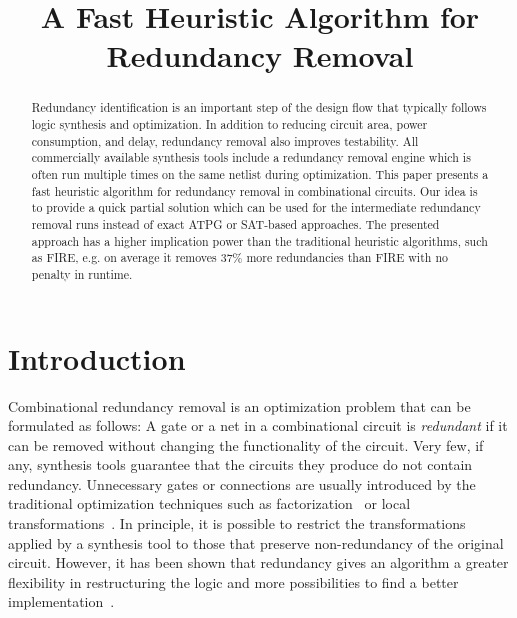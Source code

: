 \documentclass[conference]{IEEEtran} \usepackage{times}
\begin{document}
\title{A Fast Heuristic Algorithm for Redundancy Removal}
\author{
\and
{}
}

\maketitle

\begin{abstract}
Redundancy identification is an important step of the design flow that typically follows logic synthesis and optimization. In addition to reducing circuit area, power consumption, and delay, redundancy removal also improves testability.  All commercially available synthesis tools include a redundancy removal engine which is often run multiple times on the same netlist during optimization. This paper presents a fast heuristic algorithm for redundancy removal in combinational circuits. Our idea is to provide a quick partial solution which can be used for the intermediate redundancy removal runs instead of exact ATPG or SAT-based approaches. The presented approach has a higher implication power than the traditional heuristic algorithms, such as FIRE, e.g. on average it removes 37\% more redundancies than FIRE with no penalty in runtime. 
\end{abstract} 

\section{Introduction}
\label{into}

Combinational redundancy removal is an optimization problem that can
be formulated as follows: A gate or a net in a combinational circuit
is {\em redundant} if it can be removed without changing the functionality
of the circuit.
Very few, if any, synthesis tools
guarantee that the circuits they produce do not contain redundancy.
Unnecessary gates or connections are usually introduced by the
traditional optimization techniques such as factorization~\cite{BrM82}
or local transformations~\cite{darringer}.  In principle, it is
possible to restrict the transformations applied by a synthesis tool
to those that preserve non-redundancy of the original
circuit. However, it has been shown that redundancy gives an algorithm
a greater flexibility in restructuring the logic and more
possibilities to find a better implementation~\cite{SeD01}.
\end{document}
